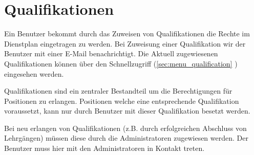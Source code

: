 \chapter{Qualifikationen}
\label{cha:qualification}
Ein Benutzer bekommt durch das Zuweisen von Qualifikationen die Rechte im Dienstplan eingetragen zu werden. Bei Zuweisung einer Qualifikation wir der Benutzer mit einer E-Mail benachrichtigt. Die Aktuell zugewiesenen Qualifikationen können über den Schnellzugriff (\ref{sec:menu_qualification} \textit{}) eingesehen werden.

\noindent Qualifikationen sind ein zentraler Bestandteil um die  Berechtigungen für Positionen zu erlangen. Positionen welche eine entsprechende Qualifikation voraussetzt, kann nur durch Benutzer mit dieser Qualifikation besetzt werden.

\noindent Bei neu erlangen von Qualifikationen (z.B. durch erfolgreichen Abschluss von Lehrgängen) müssen diese durch die Administratoren zugewiesen werden. Der Benutzer muss hier mit den Administratoren in Kontakt treten.